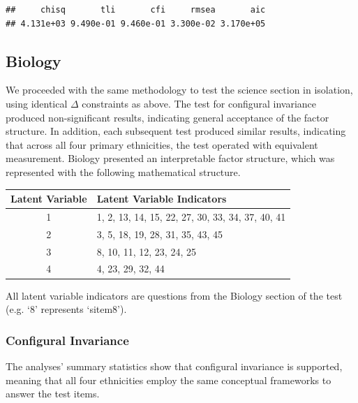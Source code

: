 \documentclass{article}\usepackage[]{graphicx}\usepackage[]{color}
\makeatletter
\newenvironment{kframe}{%
 \def\at@end@of@kframe{}%
 \ifinner\ifhmode%
  \def\at@end@of@kframe{\end{minipage}}%
  \begin{minipage}{\columnwidth}%
 \fi\fi%
 \def\FrameCommand##1{\hskip\@totalleftmargin \hskip-\fboxsep
 \colorbox{shadecolor}{##1}\hskip-\fboxsep
     \hskip-\linewidth \hskip-\@totalleftmargin \hskip\columnwidth}%
 \MakeFramed {\advance\hsize-\width
   \@totalleftmargin\z@ \linewidth\hsize
   \@setminipage}}%
 {\par\unskip\endMakeFramed%
 \at@end@of@kframe}
\newenvironment{knitrout}{}{} %
\makeatother
\begin{document}
\begin{knitrout}
\color{fgcolor}\begin{kframe}
\begin{verbatim}
##     chisq       tli       cfi     rmsea       aic 
## 4.131e+03 9.490e-01 9.460e-01 3.300e-02 3.170e+05
\end{verbatim}
\end{kframe}
\end{knitrout}


\subsection{Biology}
We proceeded with the same methodology to test the science section in isolation, using identical $\Delta$ constraints as above. The test for configural invariance produced non-significant results, indicating general acceptance of the factor structure. In addition, each subsequent test produced similar results, indicating that across all four primary ethnicities, the test operated with equivalent measurement. Biology presented an interpretable factor structure, which was represented with the following mathematical structure.

\vspace{0.25cm}

\begin{minipage}{\linewidth}
\begin{tabular}{|c|l|}
\multicolumn{1}{c}{Latent Variable} & \multicolumn{1}{l}{Latent Variable Indicators}\tabularnewline
\hline 
1 & 1, 2, 13, 14, 15, 22, 27, 30, 33, 34, 37, 40, 41\tabularnewline
\hline 
2 & 3, 5, 18, 19, 28, 31, 35, 43, 45\tabularnewline
\hline 
3 & 8, 10, 11, 12, 23, 24, 25\tabularnewline
\hline 
4 & 4, 23, 29, 32, 44\tabularnewline
\hline 
\end{tabular}

\bigskip

All latent variable indicators are questions from the Biology section of the test (e.g. `8' represents `sitem8').

\end{minipage}



\subsubsection{Configural Invariance}
The analyses' summary statistics show that configural invariance is supported, meaning that all four ethnicities employ the same conceptual frameworks to answer the test items.
\end{document}
